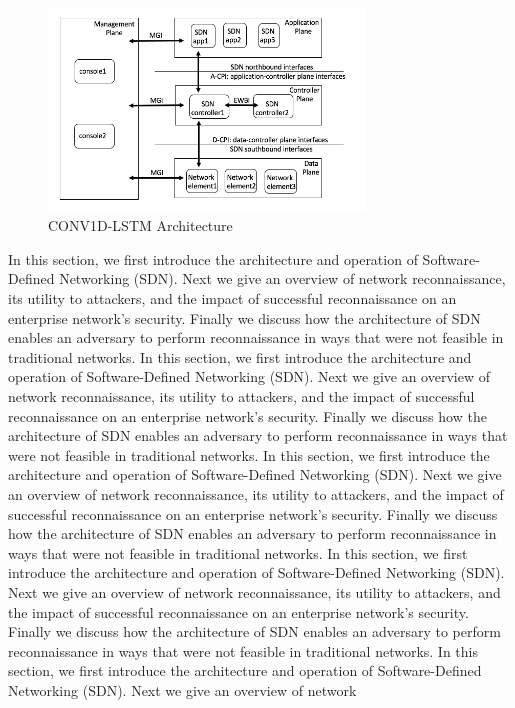 \begin{figure}[t]
  \centering 
  \includegraphics[width=3.3in]{img/CONV1D-LSTM.png} 
  \caption{CONV1D-LSTM Architecture} 
  \label{fig:CONV1D-LSTM} 
\end{figure}

In this section, we first introduce the architecture and operation of
Software-Defined Networking (SDN). Next we give an overview of network 
reconnaissance, its utility to attackers, and the impact of successful
reconnaissance on an enterprise network's security. Finally  we discuss
how the architecture of SDN enables an adversary to perform reconnaissance 
in ways that were not feasible in traditional networks. In this section, we first introduce the architecture and operation of
Software-Defined Networking (SDN). Next we give an overview of network 
reconnaissance, its utility to attackers, and the impact of successful
reconnaissance on an enterprise network's security. Finally  we discuss
how the architecture of SDN enables an adversary to perform reconnaissance 
in ways that were not feasible in traditional networks. 
In this section, we first introduce the architecture and operation of
Software-Defined Networking (SDN). Next we give an overview of network 
reconnaissance, its utility to attackers, and the impact of successful
reconnaissance on an enterprise network's security. Finally  we discuss
how the architecture of SDN enables an adversary to perform reconnaissance 
in ways that were not feasible in traditional networks. 
In this section, we first introduce the architecture and operation of
Software-Defined Networking (SDN). Next we give an overview of network 
reconnaissance, its utility to attackers, and the impact of successful
reconnaissance on an enterprise network's security. Finally  we discuss
how the architecture of SDN enables an adversary to perform reconnaissance 
in ways that were not feasible in traditional networks. 
In this section, we first introduce the architecture and operation of
Software-Defined Networking (SDN). Next we give an overview of network 
